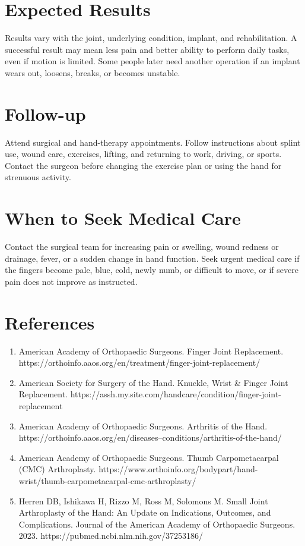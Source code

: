 \section*{Expected Results}
Results vary with the joint, underlying condition, implant, and rehabilitation. A successful result may mean less pain and better ability to perform daily tasks, even if motion is limited. Some people later need another operation if an implant wears out, loosens, breaks, or becomes unstable.

\section*{Follow-up}
Attend surgical and hand-therapy appointments. Follow instructions about splint use, wound care, exercises, lifting, and returning to work, driving, or sports. Contact the surgeon before changing the exercise plan or using the hand for strenuous activity.

\section*{When to Seek Medical Care}
Contact the surgical team for increasing pain or swelling, wound redness or drainage, fever, or a sudden change in hand function. Seek urgent medical care if the fingers become pale, blue, cold, newly numb, or difficult to move, or if severe pain does not improve as instructed.

\section*{References}
\begin{enumerate}
  \item American Academy of Orthopaedic Surgeons. Finger Joint Replacement. https://orthoinfo.aaos.org/en/treatment/finger-joint-replacement/
  \item American Society for Surgery of the Hand. Knuckle, Wrist \& Finger Joint Replacement. https://assh.my.site.com/handcare/condition/finger-joint-replacement
  \item American Academy of Orthopaedic Surgeons. Arthritis of the Hand. https://orthoinfo.aaos.org/en/diseases--conditions/arthritis-of-the-hand/
  \item American Academy of Orthopaedic Surgeons. Thumb Carpometacarpal (CMC) Arthroplasty. https://www.orthoinfo.org/bodypart/hand-wrist/thumb-carpometacarpal-cmc-arthroplasty/
  \item Herren DB, Ishikawa H, Rizzo M, Ross M, Solomons M. Small Joint Arthroplasty of the Hand: An Update on Indications, Outcomes, and Complications. Journal of the American Academy of Orthopaedic Surgeons. 2023. https://pubmed.ncbi.nlm.nih.gov/37253186/
\end{enumerate}

\clearpage
